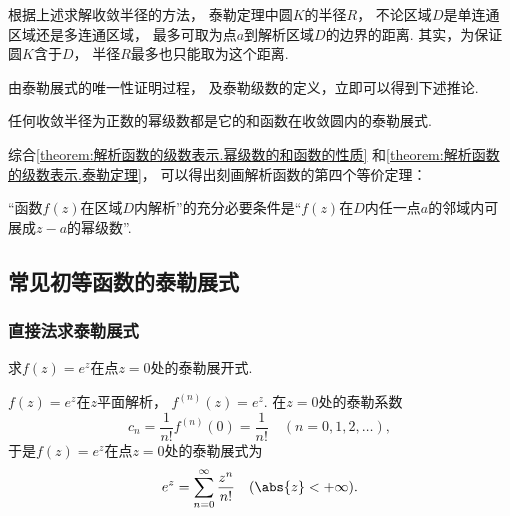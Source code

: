 根据上述求解收敛半径的方法，
泰勒定理中圆\(K\)的半径\(R\)，
不论区域\(D\)是单连通区域还是多连通区域，
最多可取为点\(a\)到解析区域\(D\)的边界的距离.
其实，为保证圆\(K\)含于\(D\)，
半径\(R\)最多也只能取为这个距离.

由泰勒展式的唯一性证明过程，
及泰勒级数的定义，立即可以得到下述推论.
\begin{corollary}
任何收敛半径为正数的幂级数都是它的和函数在收敛圆内的泰勒展式.
\end{corollary}

综合\cref{theorem:解析函数的级数表示.幂级数的和函数的性质}
和\cref{theorem:解析函数的级数表示.泰勒定理}，
可以得出刻画解析函数的第四个等价定理：
\begin{theorem}
“函数\(f(z)\)在区域\(D\)内解析”的充分必要条件是“\(f(z)\)在\(D\)内任一点\(a\)的邻域内可展成\(z-a\)的幂级数”.
\end{theorem}

\subsection{常见初等函数的泰勒展式}
\subsubsection{直接法求泰勒展式}
\begin{example}
求\(f(z) = e^z\)在点\(z = 0\)处的泰勒展开式.
\begin{solution}
\(f(z) = e^z\)在\(z\)平面解析，
\(f^{(n)}(z) = e^z\).
在\(z = 0\)处的泰勒系数\[
	c_n = \frac{1}{n!} f^{(n)}(0) = \frac{1}{n!}
	\quad(n=0,1,2,\dotsc),
\]
于是\(f(z) = e^z\)在点\(z = 0\)处的泰勒展式为
\begin{equation}\label{equation:解析函数的级数表示.指数函数的泰勒展式}
	e^z = \sum_{n=0}^\infty \frac{z^n}{n!}
	\quad(\abs{z} < +\infty).
\end{equation}
\end{solution}
\end{example}

